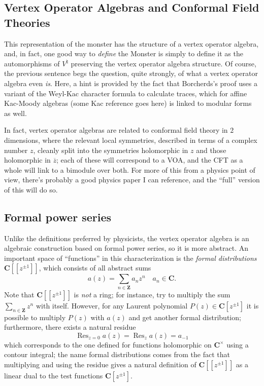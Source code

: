 \documentclass{article}
\newcommand{\CC}{\mathbold{C}}
\newcommand{\ZZ}{\mathbold{Z}}
\DeclareMathOperator{\Res}{Res}
\begin{document}
\subsection{Vertex Operator Algebras and Conformal Field Theories}
This representation of the monster has the structure of a vertex operator algebra, and, in fact, one good way to \textit{define} the Monster is simply to define it as the automorphisms of $V^\natural$ preserving the vertex operator algebra structure.  Of course, the previous sentence begs the question, quite strongly, of what a vertex operator algebra even \textit{is}.  Here, a hint is provided by the fact that Borcherds's proof uses a variant of the Weyl-Kac character formula to calculate traces, which for affine Kac-Moody algebras (some Kac reference goes here) is linked to modular forms as well.

In fact, vertex operator algebras are related to conformal field theory in $2$ dimensions, where the relevant local symmetries, described in terms of a complex number $z$, cleanly split into the symmetries holomorphic in $z$ and those holomorphic in $\overline{z}$; each of these will correspond to a VOA, and the CFT as a whole will link to a bimodule over both.  For more of this from a physics point of view, there's probably a good physics paper I can reference, and the ``full'' version of this will do so.

\subsection{Formal power series}

Unlike the definitions preferred by physicists, the vertex operator algebra is an algebraic construction based on formal power series, so it is more abstract.  An important space of ``functions'' in this characterization is the \textit{formal distributions} $\CC[[z^{\pm 1}]]$, which consists of all abstract sums
\[a(z)=\sum_{n \in \ZZ} a_n z^n \quad a_n \in \CC. \]
Note that $\CC[[z^{\pm 1}]]$ is \textit{not} a ring; for instance, try to multiply the sum $\sum_{n \in \ZZ} z^n$ with itself.  However, for any Laurent polynomial $P(z) \in \CC[z^{\pm 1}]$ it is possible to multiply $P(z)$ with $a(z)$ and get another formal distribution; furthermore, there exists a natural residue
\[\Res_{z=0} a(z)=\Res_z a(z)=a_{-1} \]
which corresponds to the one defined for functions holomorphic on $\CC^\times$ using a contour integral; the name formal distributions comes from the fact that multiplying and using the residue gives a natural definition of $\CC[[z^{\pm 1}]]$ as a linear dual to the test functions $\CC[z^{\pm 1}]$.
\end{document}

